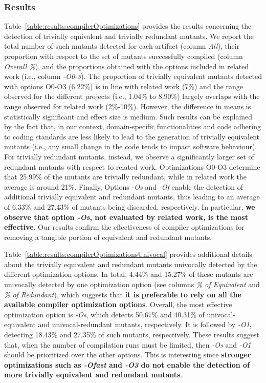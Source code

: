 \subsubsection*{Results}



Table~\ref{table:results:compilerOptimizations} provides the results concerning the detection of trivially equivalent and trivially redundant mutants. We report the total number of such mutants detected for each artifact (column \emph{All}), their proportion with respect to the set of mutants successfully compiled (column \emph{Overall \%}), and the proportions obtained with the options included in related work (i.e., column \emph{-O0-3}). 
 The proportion of trivially equivalent mutants detected with options O0-O3 (6.22\%) is in line with related work (7\%) and the range observed for the different projects (i.e., 1.04\% to 8.90\%) largely overlaps with the range observed for related work (2\%-10\%). However, the difference in means is statistically significant and effect size is medium. Such results can be explained by the fact that, in our context, domain-specific functionalities and code adhering to coding standards are less likely to lead to the generation of trivially equivalent mutants (i.e., any small change in the code tends to impact software behaviour).
 For trivially redundant mutants, instead, we observe a significantly larger set of redundant mutants with respect to related work. Optimizations O0-O3 determine that 25.99\% of the mutants are trivially redundant, while in related work the average is around 21\%. Finally,  
 Options \emph{-Os} and \emph{-Of} enable the detection of additional trivially equivalent and redundant mutants, thus leading to an average of 6.33\% and 27.43\% of mutants being discarded, respectively. In particular, \textbf{we observe that option \emph{-Os}, not evaluated by related work, is the most effective}. Our results confirm the effectiveness of compiler optimizations for removing a tangible portion of equivalent and redundant mutants.
 
Table~\ref{table:results:compilerOptimizationsUnivocal} provides additional details about the trivially equivalent and redundant mutants univocally detected by the different optimization options. In total, 4.44\% and 15.27\% of these mutants are univocally detected  by one optimization option (see columns \emph{\% of Equivalent} and \emph{\% of Redundant}), which suggests that \textbf{it is preferable to rely on all the available compiler optimization options}. Overall, the most effective optimization option is \emph{-Os}, which detects 50.67\% and 40.31\% of univocal-equivalent and univocal-redundant mutants, respectively. It is followed by \emph{-O1}, detecting 18.43\% and 27.35\% of such mutants, respectively. These results suggest that, when the number of compilation runs must be limited, then \emph{-Os} and \emph{-O1} should be prioritized over the other options. This is interesting since \textbf{stronger optimizations such as \emph{-Ofast} and \emph{-O3} do not enable the detection of more trivially equivalent and redundant mutants}.

